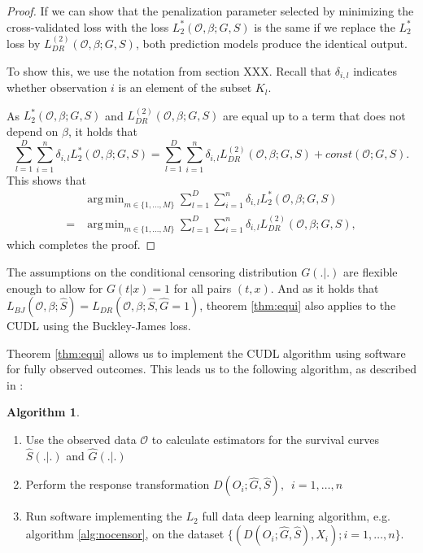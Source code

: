 \documentclass[12pt, a4paper]{article}
\theoremstyle{definition}
\newtheorem{Algorithm}{Algorithm}[section]
\theoremstyle{plain}
\numberwithin{equation}{section}
\numberwithin{figure}{section}
\numberwithin{table}{section}
\DeclareMathOperator*{\argmin}{arg\,min}
\begin{document}
\begin{proof}
		 If we can show that the penalization parameter selected by minimizing the cross-validated loss with the loss $L_2^*(\mathcal{O}, \beta; G,S)$ is the same if we replace the $L_2^*$ loss by $L_{DR}^{(2)}(\mathcal{O}, \beta; G,S)$, both prediction models produce the identical output.
		
		To show this, we use the notation from section XXX.
		Recall that $\delta_{i,l}$ indicates whether observation $i$ is an element of the subset $K_l$.
		
		As $L_2^*(\mathcal{O}, \beta; G,S)$ and $L_{DR}^{(2)}(\mathcal{O}, \beta; G,S)$ are equal up to a term that does not depend on $\beta$, it holds that
		\begin{equation*}
		\sum_{l=1}^{D} \sum_{i=1}^{n} \delta_{i,l} L_2^*(\mathcal{O}, \beta; G,S) = \sum_{l=1}^{D} \sum_{i=1}^{n} \delta_{i,l} L_{DR}^{(2)}(\mathcal{O}, \beta; G,S) + const(\mathcal{O}; G,S).
		\end{equation*}
		This shows that
		\begin{equation*}
		\begin{split}
		 &\argmin_{m \in \{1,\dots, M\}}\sum_{l=1}^{D} \sum_{i=1}^{n} \delta_{i,l} L_2^*(\mathcal{O}, \beta; G,S)\\
		  = &\argmin_{m \in \{1,\dots, M\}}\sum_{l=1}^{D} \sum_{i=1}^{n} \delta_{i,l} L_{DR}^{(2)}(\mathcal{O}, \beta; G,S),
		 \end{split}
		\end{equation*}
		which completes the proof.
	\end{proof}

	The assumptions on the conditional censoring distribution $G(.\vert .)$ are flexible enough to allow for $G(t\vert x)=1$ for all pairs $(t,x)$.
	And as it holds that $L_{BJ}(\mathcal{O}, \beta; \hat{S})=L_{DR}(\mathcal{O}, \beta; \hat{S}, \hat{G} = 1)$, theorem \ref{thm:equi} also applies to the CUDL using the Buckley-James loss.
	
	Theorem \ref{thm:equi} allows us to implement the CUDL algorithm using software for fully observed outcomes.
	This leads us to the following algorithm, as described in \citet*{basearticle}:
	\begin{Algorithm}\label{alg:censor}~
		\begin{enumerate}
			\item Use the observed data $\mathcal{O}$ to calculate estimators for the survival curves $\hat{S}(.\vert.)$ and $\hat{G}(.\vert .)$
			\item Perform the response transformation $D(O_i; \hat{G},\hat{S}),$~$ i = 1,\dots,n$
			\item Run software implementing the $L_2$ full data deep learning algorithm, e.g. algorithm \ref{alg:nocensor}, on the dataset $\{(D(O_i; \hat{G},\hat{S}), X_i); i = 1,\dots,n\}$.
		\end{enumerate}
	\end{Algorithm}
\end{document}
